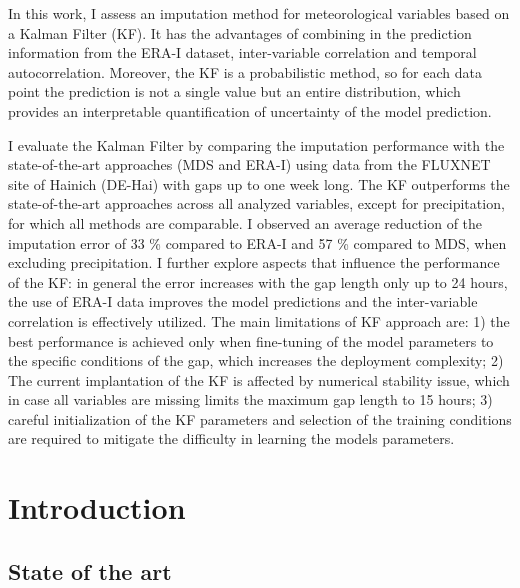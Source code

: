 \documentclass{article}
\let\Oldsection\section
\renewcommand{\section}{\FloatBarrier\Oldsection}
\let\Oldsubsection\subsection
\renewcommand{\subsection}{\FloatBarrier\Oldsubsection}
\begin{document}
In this work, I assess an imputation method for meteorological variables based on a Kalman Filter (KF). It has the advantages of combining in the prediction information from the ERA-I dataset, inter-variable correlation and  temporal autocorrelation. Moreover, the KF is a probabilistic method, so for each data point the prediction is not a single value but an entire distribution, which provides an interpretable quantification of uncertainty of the model prediction.

I evaluate the Kalman Filter by  comparing the imputation performance with the state-of-the-art approaches (MDS and ERA-I) using data from the FLUXNET site of Hainich (DE-Hai) with gaps up to one week long. The KF outperforms the state-of-the-art approaches across all analyzed variables, except for precipitation, for which all methods are comparable. I observed an average reduction of the imputation error of 33 \% compared to ERA-I and  57 \% compared to MDS, when excluding precipitation. I further explore aspects that influence the performance of the KF: in general the error increases with the gap length only up to 24 hours, the use of ERA-I data improves the model predictions and the inter-variable correlation is effectively utilized.
The main limitations of KF approach are: 1) the best performance is achieved only when fine-tuning of the model parameters to the specific conditions of the gap, which increases the deployment complexity; 2) The current implantation of the KF is affected by numerical stability issue, which in case all variables are missing limits the maximum gap length to 15 hours; 3) careful initialization of the KF parameters and selection of the training conditions are required to mitigate the difficulty in learning the models parameters. 
\clearpage
\thispagestyle{empty}

\tableofcontents
\thispagestyle{empty}
\clearpage

\section{Introduction}

\subsection{State of the art}
\end{document}
